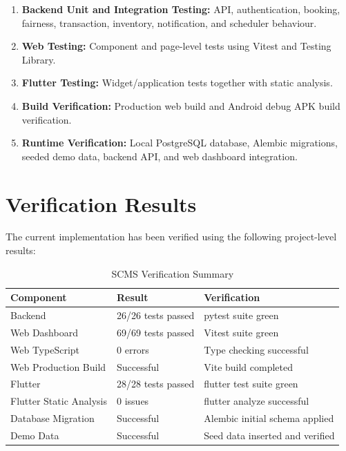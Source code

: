\documentclass[12pt,a4paper,oneside]{report}
\begin{document}
\begin{enumerate}
    \item \textbf{Backend Unit and Integration Testing:} API, authentication, booking, fairness, transaction, inventory, notification, and scheduler behaviour.
    \item \textbf{Web Testing:} Component and page-level tests using Vitest and Testing Library.
    \item \textbf{Flutter Testing:} Widget/application tests together with static analysis.
    \item \textbf{Build Verification:} Production web build and Android debug APK build verification.
    \item \textbf{Runtime Verification:} Local PostgreSQL database, Alembic migrations, seeded demo data, backend API, and web dashboard integration.
\end{enumerate}

\section{Verification Results}

The current implementation has been verified using the following project-level results:

\begin{table}[H]
\centering
\small
\begin{tabular}{p{4.2cm}p{3.2cm}p{5.2cm}}
\toprule
\textbf{Component} & \textbf{Result} & \textbf{Verification}\\
\midrule
Backend & 26/26 tests passed & pytest suite green\\
Web Dashboard & 69/69 tests passed & Vitest suite green\\
Web TypeScript & 0 errors & Type checking successful\\
Web Production Build & Successful & Vite build completed\\
Flutter & 28/28 tests passed & flutter test suite green\\
Flutter Static Analysis & 0 issues & flutter analyze successful\\
Database Migration & Successful & Alembic initial schema applied\\
Demo Data & Successful & Seed data inserted and verified\\
\bottomrule
\end{tabular}
\caption{SCMS Verification Summary}
\label{tab:verification}
\end{table}
\end{document}
